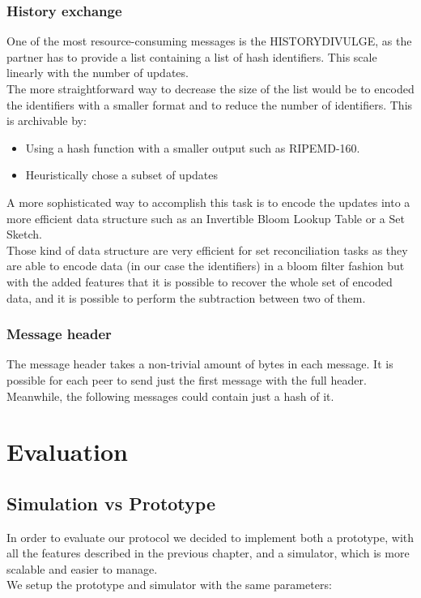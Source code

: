 \documentclass[mscthesis]{usiinfthesis}
\begin{document}
\subsection{History exchange}
One of the most resource-consuming messages is the HISTORYDIVULGE, as the partner has to provide a list containing a list of hash identifiers. This scale linearly with the number of updates. \\
The more straightforward way to decrease the size of the list would be to encoded the identifiers with a smaller format and to reduce the number of identifiers. This is archivable by:
\begin{itemize}
	\item Using a hash function with a smaller output such as RIPEMD-160.
	\item Heuristically chose a subset of updates
\end{itemize}
A more sophisticated way to accomplish this task is to encode the updates into a more efficient data structure such as an Invertible Bloom Lookup Table\citep{goodrich2011invertible} or a Set Sketch\citep{cryptoeprint:2003:235}.  \\
Those kind of data structure are very efficient for set reconciliation tasks as they are able to encode data (in our case the identifiers) in a bloom filter fashion but with the added features that it is possible to recover the whole set of encoded data, and it is possible to perform the subtraction between two of them.

\subsection{Message header}
The message header takes a non-trivial amount of bytes in each message. It is possible for each peer to send just the first message with the full header.\\ Meanwhile, the following messages could contain just a hash of it.

\chapter{Evaluation}
\section{Simulation vs Prototype}
In order to evaluate our protocol we decided to implement both a prototype, with all the features described in the previous chapter, and a simulator, which is more scalable and easier to manage. \\
We setup the prototype and simulator with the same parameters: 
\end{document}

